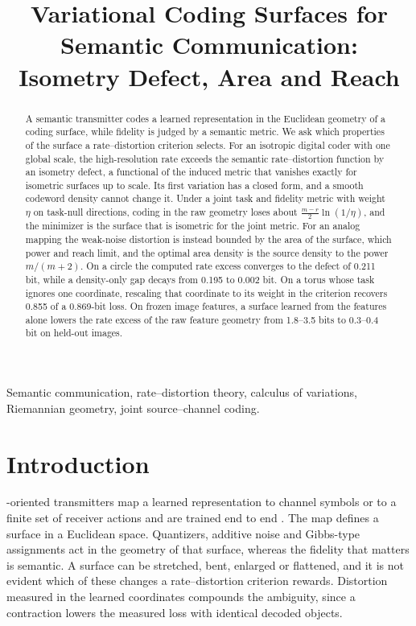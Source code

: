 \documentclass[journal]{IEEEtran}
\title{Variational Coding Surfaces for Semantic Communication: Isometry Defect, Area and Reach}
\author{} %
\begin{document}
\maketitle
\begin{abstract}
A semantic transmitter codes a learned representation in the Euclidean geometry of a coding surface, while fidelity is judged by a semantic metric. We ask which properties of the surface a rate--distortion criterion selects. For an isotropic digital coder with one global scale, the high-resolution rate exceeds the semantic rate--distortion function by an isometry defect, a functional of the induced metric that vanishes exactly for isometric surfaces up to scale. Its first variation has a closed form, and a smooth codeword density cannot change it. Under a joint task and fidelity metric with weight $\eta$ on task-null directions, coding in the raw geometry loses about $\frac{m-r}2\ln(1/\eta)$, and the minimizer is the surface that is isometric for the joint metric. For an analog mapping the weak-noise distortion is instead bounded by the area of the surface, which power and reach limit, and the optimal area density is the source density to the power $m/(m+2)$. On a circle the computed rate excess converges to the defect of 0.211 bit, while a density-only gap decays from 0.195 to 0.002 bit. On a torus whose task ignores one coordinate, rescaling that coordinate to its weight in the criterion recovers 0.855 of a 0.869-bit loss. On frozen image features, a surface learned from the features alone lowers the rate excess of the raw feature geometry from 1.8--3.5 bits to 0.3--0.4 bit on held-out images.
\end{abstract}
\begin{IEEEkeywords}
Semantic communication, rate--distortion theory, calculus of variations, Riemannian geometry, joint source--channel coding.
\end{IEEEkeywords}

\section{Introduction}
-oriented transmitters map a learned representation to channel symbols or to a finite set of receiver actions and are trained end to end \cite{xie2021deepsc,gunduz2023beyond}. The map defines a surface in a Euclidean space. Quantizers, additive noise and Gibbs-type assignments act in the geometry of that surface, whereas the fidelity that matters is semantic. A surface can be stretched, bent, enlarged or flattened, and it is not evident which of these changes a rate--distortion criterion rewards. Distortion measured in the learned coordinates compounds the ambiguity, since a contraction lowers the measured loss with identical decoded objects.
\end{document}
